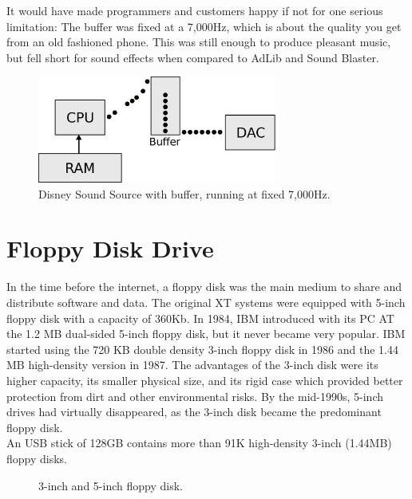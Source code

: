 \documentclass[book.tex]{subfiles}
\begin{document}
It would have made programmers and customers happy if not for one serious limitation: The buffer was fixed at a 7,000Hz, which is about the quality you get from an old fashioned phone. This was still enough to produce pleasant music, but fell short for sound effects when compared to AdLib and Sound Blaster.

\par
 \begin{figure}[H]
\centering
\includegraphics[width=0.7\textwidth]{imgs/drawings/DSS_buffer.eps}
\caption{Disney Sound Source with buffer, running at fixed 7,000Hz.}
\label{fig:DSS_buffer}
\end{figure}

  

\section{Floppy Disk Drive}
In the time before the internet, a floppy disk was the main medium to share and distribute software and data. The original XT systems were equipped with 5-inch floppy disk with a capacity of 360Kb. In 1984, IBM introduced with its PC AT the 1.2 MB dual-sided 5-inch floppy disk, but it never became very popular. IBM started using the 720 KB double density 3-inch floppy disk in 1986 and the 1.44 MB high-density version in 1987. The advantages of the 3-inch disk were its higher capacity, its smaller physical size, and its rigid case which provided better protection from dirt and other environmental risks. By the mid-1990s, 5-inch drives had virtually disappeared, as the 3-inch disk became the predominant floppy disk. \\

\vspace{10pt}
 An USB stick of 128GB contains more than 91K high-density 3-inch (1.44MB) floppy disks.\\
\par

\begin{figure}[H]

  \begin{minipage}{0.48\textwidth}
  \centering
  \end{minipage}
  \hfill
  \begin{minipage}{0.48\textwidth}
  \centering
  \end{minipage}
  \caption{3-inch and 5-inch floppy disk.}
  \end{figure}
\par
\end{document}
